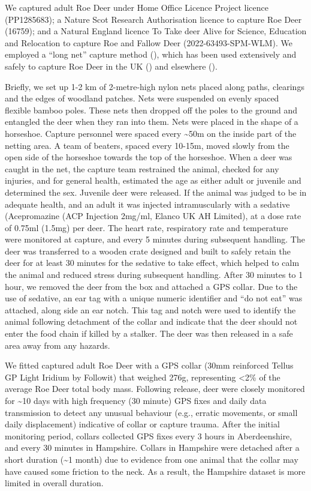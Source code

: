 \documentclass[10pt,a4paper]{article}
\begin{document}
We captured adult Roe Deer under Home Office Licence Project licence (PP1285683); a Nature Scot Research Authorisation licence to capture Roe Deer (16759); and a Natural England licence To Take deer Alive for Science, Education and Relocation to capture Roe and Fallow Deer (2022-63493-SPM-WLM).
We employed a ``long net'' capture method (), which has been used extensively and safely to capture Roe Deer in the UK () and elsewhere ().

Briefly, we set up 1-2 km of 2-metre-high nylon nets placed along paths, clearings and the edges of woodland patches.
Nets were suspended on evenly spaced flexible bamboo poles.
These nets then dropped off the poles to the ground and entangled the deer when they ran into them.
Nets were placed in the shape of a horseshoe.
Capture personnel were spaced every \textasciitilde50m on the inside part of the netting area.
A team of beaters, spaced every 10-15m, moved slowly from the open side of the horseshoe towards the top of the horseshoe.
When a deer was caught in the net, the capture team restrained the animal, checked for any injuries, and for general health, estimated the age as either adult or juvenile and determined the sex.
Juvenile deer were released.
If the animal was judged to be in adequate health, and an adult it was injected intramuscularly with a sedative (Acepromazine (ACP Injection 2mg/ml, Elanco UK AH Limited), at a dose rate of 0.75ml (1.5mg) per deer.
The heart rate, respiratory rate and temperature were monitored at capture, and every 5 minutes during subsequent handling.
The deer was transferred to a wooden crate designed and built to safely retain the deer for at least 30 minutes for the sedative to take effect, which helped to calm the animal and reduced stress during subsequent handling.
After 30 minutes to 1 hour, we removed the deer from the box and attached a GPS collar.
Due to the use of sedative, an ear tag with a unique numeric identifier and ``do not eat'' was attached, along side an ear notch.
This tag and notch were used to identify the animal following detachment of the collar and indicate that the deer should not enter the food chain if killed by a stalker.
The deer was then released in a safe area away from any hazards.

We fitted captured adult Roe Deer with a GPS collar (30mm reinforced Tellus GP Light Iridium by Followit) that weighed 276g, representing \textless2\% of the average Roe Deer total body mass.
Following release, deer were closely monitored for \textasciitilde10 days with high frequency (30 minute) GPS fixes and daily data transmission to detect any unusual behaviour (e.g., erratic movements, or small daily displacement) indicative of collar or capture trauma.
After the initial monitoring period, collars collected GPS fixes every 3 hours in Aberdeenshire, and every 30 minutes in Hampshire.
Collars in Hampshire were detached after a short duration (\textasciitilde1 month) due to evidence from one animal that the collar may have caused some friction to the neck.
As a result, the Hampshire dataset is more limited in overall duration.
\end{document}
